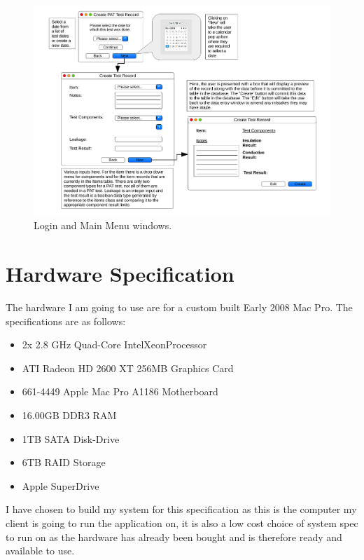 \begin{landscape}
\newpage

\begin{figure}[H]
    \begin{center}
        \includegraphics[width=500px]{./Design/user_interface/Add_pat_test_record_interface.pdf}
    \end{center}
    \caption{Login and Main Menu windows.} \label{fig:print_function_result}
\end{figure}

\end{landscape}

\section{Hardware Specification}

The hardware I am going to use are for a custom built Early 2008 Mac Pro. The specifications are as follows:
\begin{itemize}
    \item 2x 2.8 GHz Quad-Core Intel\textregistered Xeon\texttrademark Processor
    \item ATI Radeon HD 2600 XT 256MB Graphics Card
    \item 661-4449 Apple Mac Pro A1186 Motherboard
    \item 16.00GB DDR3 RAM
    \item 1TB SATA Disk-Drive
    \item 6TB RAID Storage
    \item Apple SuperDrive \\
\end{itemize}

I have chosen to build my system for this specification as this is the computer my client is going to run the application on, it is also a low cost choice of system spec to run on as the hardware has already been bought and is therefore ready and available to use.

